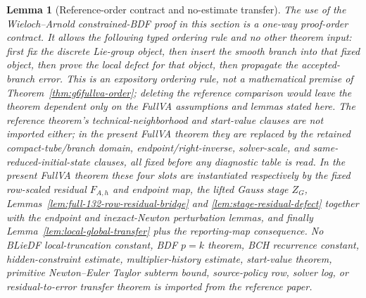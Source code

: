 \documentclass[preprint,12pt]{elsarticle}
\newtheorem{lemma}{Lemma}
\begin{document}
\begin{lemma}[Reference-order contract and no-estimate transfer]
\label{lem:reference-order-contract}
The use of the Wieloch--Arnold constrained-BDF proof in this section is a
one-way proof-order contract.  It allows the following typed ordering rule
and no other theorem input: first fix the discrete Lie-group object, then
insert the smooth branch into that fixed object, then prove the local defect
for that object, then propagate the accepted-branch error.  This is an
expository ordering rule, not a mathematical premise of
Theorem~\ref{thm:g6fullva-order}; deleting the reference comparison would
leave the theorem dependent only on the FullVA assumptions and lemmas stated
here.  The reference theorem's technical-neighborhood and start-value clauses
are not imported either; in the present FullVA theorem they are replaced by the
retained compact-tube/branch domain, endpoint/right-inverse, solver-scale, and
same-reduced-initial-state clauses, all fixed before any diagnostic table is
read.  In the present
FullVA theorem these four slots are instantiated respectively by the fixed
row-scaled residual \(F_{A,h}\) and endpoint map, the lifted Gauss stage
\(Z_G\), Lemmas~\ref{lem:full-132-row-residual-bridge} and
\ref{lem:stage-residual-defect} together with the endpoint and inexact-Newton
perturbation lemmas, and finally Lemma~\ref{lem:local-global-transfer} plus
the reporting-map consequence.  No BLieDF local-truncation constant, BDF
\(p=k\) theorem, BCH recurrence constant, hidden-constraint estimate,
multiplier-history estimate, start-value theorem, primitive Newton--Euler
Taylor subterm bound, source-policy row, solver log, or residual-to-error
transfer theorem is imported from the reference paper.
\end{lemma}
\end{document}
